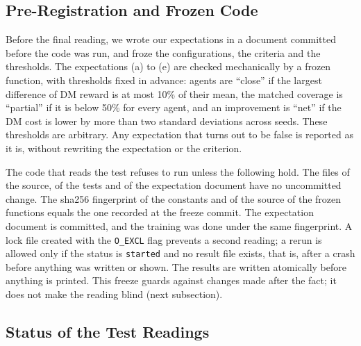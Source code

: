 \subsection{Pre-Registration and Frozen Code}
\label{sec:prereg}

Before the final reading, we wrote our expectations in a document committed before the code was run, and froze the configurations, the criteria and the thresholds.%
The expectations (a) to (e) are checked mechanically by a frozen function, with thresholds fixed in advance: agents are ``close'' if the largest difference of DM reward is at most 10\% of their mean, the matched coverage is ``partial'' if it is below 50\% for every agent, and an improvement is ``net'' if the DM cost is lower by more than two standard deviations across seeds.%
These thresholds are arbitrary.%
Any expectation that turns out to be false is reported as it is, without rewriting the expectation or the criterion.%

The code that reads the test refuses to run unless the following hold.%
The files of the source, of the tests and of the expectation document have no uncommitted change.%
The sha256 fingerprint of the constants and of the source of the frozen functions equals the one recorded at the freeze commit.%
The expectation document is committed, and the training was done under the same fingerprint.%
A lock file created with the \texttt{O\_EXCL} flag prevents a second reading; a rerun is allowed only if the status is \texttt{started} and no result file exists, that is, after a crash before anything was written or shown.%
The results are written atomically before anything is printed.%
This freeze guards against changes made after the fact; it does not make the reading blind (next subsection).%

\subsection{Status of the Test Readings}
\label{sec:readings}


